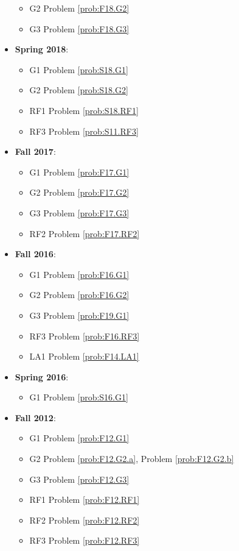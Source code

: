 \documentclass{article}
\theoremstyle{definition}
\begin{document}
\begin{itemize}
\begin{itemize}
		\item G2 Problem \ref{prob:F18.G2}
		\item G3 Problem \ref{prob:F18.G3}
	\end{itemize}
	\item \textbf{Spring 2018}:
	\begin{itemize}
		\item G1 Problem \ref{prob:S18.G1}
		\item G2 Problem \ref{prob:S18.G2}
		\item RF1 Problem \ref{prob:S18.RF1}
		\item RF3 Problem \ref{prob:S11.RF3}
	\end{itemize}
	\item \textbf{Fall 2017}:
	\begin{itemize}
		\item G1 Problem \ref{prob:F17.G1}
		\item G2 Problem \ref{prob:F17.G2}
		\item G3 Problem \ref{prob:F17.G3}
		\item RF2 Problem \ref{prob:F17.RF2}
	\end{itemize}
	\item \textbf{Fall 2016}:
	\begin{itemize}
		\item G1 Problem \ref{prob:F16.G1}
		\item G2 Problem \ref{prob:F16.G2}
		\item G3 Problem \ref{prob:F19.G1}
		\item RF3 Problem \ref{prob:F16.RF3}
		\item LA1 Problem \ref{prob:F14.LA1}
	\end{itemize}
	\item \textbf{Spring 2016}:
	\begin{itemize}
		\item G1 Problem \ref{prob:S16.G1}
	\end{itemize}
	\item \textbf{Fall 2012}:	
	\begin{itemize}
	\item G1 Problem \ref{prob:F12.G1} 
	\item G2 Problem \ref{prob:F12.G2.a}, Problem \ref{prob:F12.G2.b}
	\item G3 Problem \ref{prob:F12.G3}
	\item RF1 Problem \ref{prob:F12.RF1}
	\item RF2 Problem \ref{prob:F12.RF2}
	\item RF3 Problem \ref{prob:F12.RF3}

\end{itemize}
\end{itemize}
\end{document}
